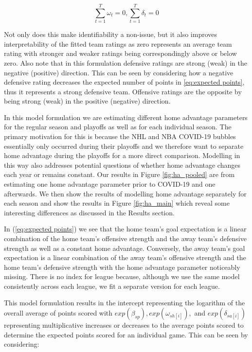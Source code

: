 \begin{equation} \label{eq:sum to zero}
\sum_{t=1}^{T} \omega_t = 0, \sum_{t=1}^{T} \delta_t = 0
\end{equation}

Not only does this make identifiability a non-issue, but it also improves interpretability of the fitted team ratings as zero represents an average team rating with stronger and weaker ratings being correspondingly above or below zero. Also note that in this formulation defensive ratings are strong (weak) in the negative (positive) direction. This can be seen by considering how a negative defensive rating decreases the expected number of points in \ref{eq:expected points}, thus it represents a strong defensive team. Offensive ratings are the opposite by being strong (weak) in the positive (negative) direction.

In this model formulation we are estimating different home advantage parameters for the regular season and playoffs as well as for each individual season. The primary motivation for this is because the NHL and NBA COVID-19 bubbles essentially only occurred during their playoffs and we therefore want to separate home advantage during the playoffs for a more direct comparison. Modelling in this way also addresses potential questions of whether home advantage changes each year or remains constant. Our results in Figure \mbox{\ref{fig:ha_pooled}} are from estimating one home advantage parameter prior to COVID-19 and one afterwards. We then show the results of modelling home advantage separately for each season and show the results in Figure \mbox{\ref{fig:ha_main}} which reveal some interesting differences as discussed in the Results section.

In (\ref{eq:expected points}) we see that the home team's goal expectation is a linear combination of the home team's offensive strength and the away team's defensive strength as well as a constant home advantage. Conversely, the away team's goal expectation is a linear combination of the away team's offensive strength and the home team's defensive strength with the home advantage parameter noticeably missing. There is no index for league because, although we use the same model consistently across each league, we fit a separate version for each league.

This model formulation results in the intercept representing the logarithm of the overall average of points scored with \(exp(\beta_{sp}), exp(\omega_{sh[i]}),\) and \(exp(\delta_{sa[i]})\) representing multiplicative increases or decreases to the average points scored to determine the expected points scored for an individual game. This can be seen by considering:

